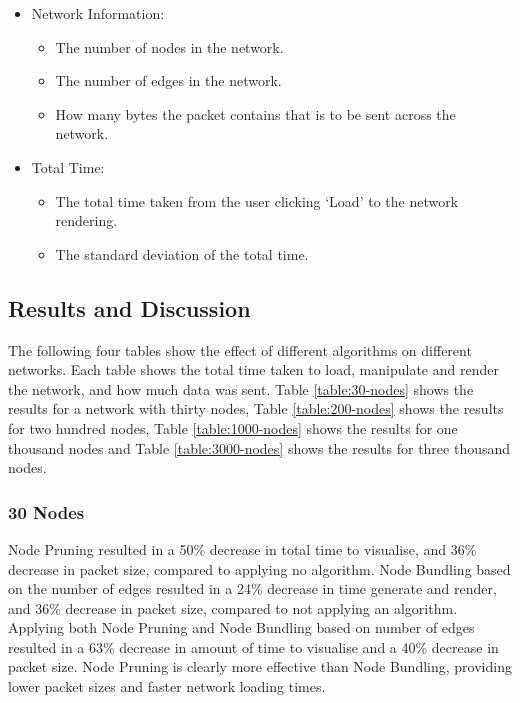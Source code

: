 \documentclass[../dissertation.tex]{subfiles}
\begin{document}
\begin{itemize}
\begin{itemize}
    \end{itemize}
    \item Network Information:
    \begin{itemize}
        \item The number of nodes in the network.
        \item The number of edges in the network.
        \item How many bytes the packet contains that is to be sent across the network.
    \end{itemize}
    \item Total Time:
    \begin{itemize}
        \item The total time taken from the user clicking `Load' to the network rendering.
        \item The standard deviation of the total time.
    \end{itemize}
\end{itemize}

\subsection{Results and Discussion}

The following four tables show the effect of different algorithms on different networks. Each table shows the total time taken to load, manipulate and render the network, and how much data was sent. Table \ref{table:30-nodes} shows the results for a network with thirty nodes, Table \ref{table:200-nodes} shows the results for two hundred nodes, Table \ref{table:1000-nodes} shows the results for one thousand nodes and Table \ref{table:3000-nodes} shows the results for three thousand nodes.

\subsubsection{30 Nodes}

Node Pruning resulted in a 50\% decrease in total time to visualise, and 36\% decrease in packet size, compared to applying no algorithm.
Node Bundling based on the number of edges resulted in a 24\% decrease in time generate and render, and 36\% decrease in packet size, compared to not applying an algorithm. Applying both Node Pruning and Node Bundling based on number of edges resulted in a 63\% decrease in amount of time to visualise and a 40\% decrease in packet size. Node Pruning is clearly more effective than Node Bundling, providing lower packet sizes and faster network loading times.
\end{document}

